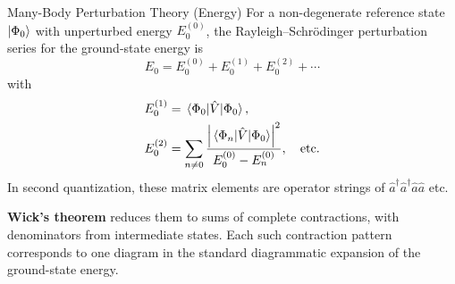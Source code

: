 \documentclass[aspectratio=169]{beamer}
\begin{document}
\begin{frame}{Many-Body Perturbation Theory (Energy)}
For a non-degenerate reference state $\ket{\Phi_0}$ with unperturbed
energy $E_0^{(0)}$,
the Rayleigh--Schr\"odinger perturbation series for the ground-state
energy is
\begin{equation}
    E_0 = E_0^{(0)} + E_0^{(1)} + E_0^{(2)} + \cdots 
\end{equation}
with
\begin{align}
    E_0^{(1)} &= \mel{\Phi_0}{\hat{V}}{\Phi_0}, \\
    E_0^{(2)} &= 
        \sum_{n\neq 0}
        \frac{
        \abs{\mel{\Phi_n}{\hat{V}}{\Phi_0}}^2
        }{
        E_0^{(0)} - E_n^{(0)}
        }, \quad \text{etc.}
\end{align}
In second quantization, these matrix elements are operator strings of
$\hat{a}^\dagger \hat{a}^\dagger \hat{a}\hat{a}$ etc.

\textbf{Wick’s theorem} reduces them to sums of complete contractions,
with denominators from intermediate states. Each such contraction
pattern corresponds to one diagram in the standard diagrammatic
expansion of the ground-state energy.
\end{frame}

\end{document}
